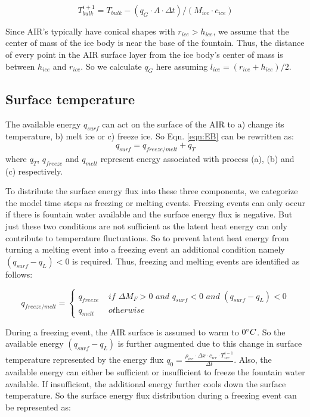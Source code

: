 \documentclass[utf8]{frontiersSCNS} %
\begin{document}
\begin{equation} T_{bulk}^{i+1} = T_{bulk} - (q_{G} \cdot A \cdot \Delta t)/(M_{ice} \cdot c_{ice}) \end{equation}

Since AIR's typically have conical shapes with $r_{ice} > h_{ice}$, we assume that the center of mass of the ice body
is near the base of the fountain. Thus, the distance of every point in the AIR surface layer from the ice body's center
of mass is between $h_{ice}$ and $r_{ice}$. So we calculate $q_{G}$ here assuming $l_{ice} = (r_{ice} + h_{ice})/2$.

\subsection{Surface temperature}
The available energy $q_{surf}$ can act on the surface of the AIR to a) change its temperature, b) melt ice or
c) freeze ice. So Eqn. \ref{eqn:EB} can be rewritten as: \begin{equation} q_{surf} = q_{freeze/melt} +
	q_{T} \end{equation}
where $q_{T}$, $q_{freeze}$ and $q_{melt}$ represent energy associated with process (a), (b) and (c) respectively.

To distribute the surface energy flux into these three components, we categorize the model time steps as freezing or
melting events. Freezing events can only occur if there is fountain water available and the surface energy flux is
negative. But just these two conditions are not sufficient as the latent heat energy can only contribute to temperature
fluctuations. So to prevent latent heat energy from turning a melting event into a freezing event an additional
condition namely $(q_{surf}-q_{L}) < 0$ is required. Thus, freezing and melting events are identified as follows:

\begin{equation}
	q_{freeze/melt} = \left\{ \begin{array}{ll}
		q_{freeze} & \textit{ if } \Delta M_{F} > 0 \textit{ and } q_{surf} < 0 \textit{ and }(q_{surf}-q_{L}) < 0 \\
		q_{melt}   & \textit{ otherwise}
	\end{array} \right.
\end{equation}

During a freezing event, the AIR surface is assumed to warm to $0 \degree C$. So the available energy $(q_{surf}-q_{L})$
is further augmented due to this change in surface temperature represented by the energy flux $q_{0} = \frac{\rho_{ice}
		\cdot \Delta x \cdot c_{ice} \cdot T_{ice}^{i-1}}{\Delta t}$. Also, the available energy can either be sufficient or
insufficient to freeze the fountain water available.  If insufficient, the additional energy further cools down the
surface temperature. So the surface energy flux distribution during a freezing event can be represented as:
\end{document}
